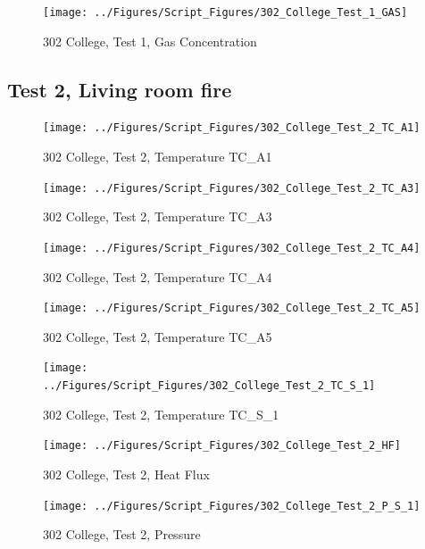 \documentclass[12pt,oneside]{book}
\begin{document}
\begin{figure}[!ht]
\texttt{[image: ../Figures/Script\_Figures/302\_College\_Test\_1\_GAS]}
\caption{302 College, Test 1, Gas Concentration}
\label{fig:302_College_Test_1_GAS}
\end{figure}


\clearpage


\subsection{Test 2, Living room fire}

\begin{figure}[!ht]
\texttt{[image: ../Figures/Script\_Figures/302\_College\_Test\_2\_TC\_A1]}
\caption{302 College, Test 2, Temperature TC\_A1}
\label{fig:302_College_Test_2_TC_A1}
\end{figure}

\begin{figure}[!ht]
\texttt{[image: ../Figures/Script\_Figures/302\_College\_Test\_2\_TC\_A3]}
\caption{302 College, Test 2, Temperature TC\_A3}
\label{fig:302_College_Test_2_TC_A3}
\end{figure}

\begin{figure}[!ht]
\texttt{[image: ../Figures/Script\_Figures/302\_College\_Test\_2\_TC\_A4]}
\caption{302 College, Test 2, Temperature TC\_A4}
\label{fig:302_College_Test_2_TC_A4}
\end{figure}

\begin{figure}[!ht]
\texttt{[image: ../Figures/Script\_Figures/302\_College\_Test\_2\_TC\_A5]}
\caption{302 College, Test 2, Temperature TC\_A5}
\label{fig:302_College_Test_2_TC_A5}
\end{figure}

\begin{figure}[!ht]
\texttt{[image: ../Figures/Script\_Figures/302\_College\_Test\_2\_TC\_S\_1]}
\caption{302 College, Test 2, Temperature TC\_S\_1}
\label{fig:302_College_Test_2_TC_S_1}
\end{figure}

\begin{figure}[!ht]
\texttt{[image: ../Figures/Script\_Figures/302\_College\_Test\_2\_HF]}
\caption{302 College, Test 2, Heat Flux}
\label{fig:302_College_Test_2_HF}
\end{figure}

\begin{figure}[!ht]
\texttt{[image: ../Figures/Script\_Figures/302\_College\_Test\_2\_P\_S\_1]}
\caption{302 College, Test 2, Pressure}
\label{fig:302_College_Test_2_P_S_1}
\end{figure}
\end{document}
